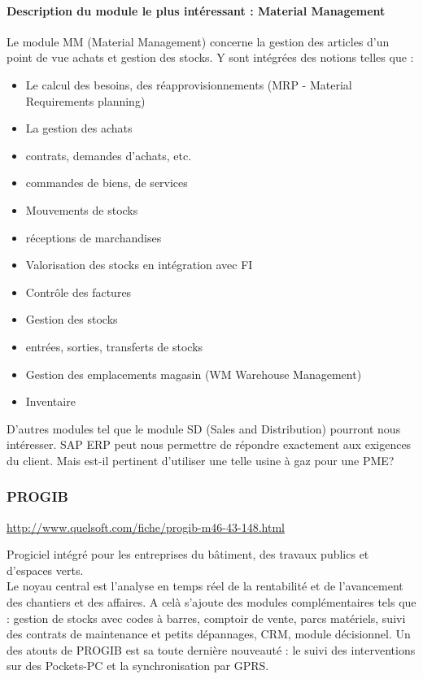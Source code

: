\paragraph{Description du module le plus intéressant : Material Management}
Le module MM (Material Management) concerne la gestion des articles d'un point de vue achats et gestion des stocks.
Y sont intégrées des notions telles que :
\begin{itemize}
    \item Le calcul des besoins, des réapprovisionnements (MRP - Material Requirements planning)
    \item La gestion des achats
    \item contrats, demandes d'achats, etc.
    \item commandes de biens, de services
    \item Mouvements de stocks
    \item réceptions de marchandises
    \item Valorisation des stocks en intégration avec FI
    \item Contrôle des factures
    \item Gestion des stocks
    \item entrées, sorties, transferts de stocks
    \item Gestion des emplacements magasin (WM Warehouse Management)
    \item Inventaire
\end{itemize}

D'autres modules tel que le module SD (Sales and Distribution) pourront nous intéresser.
SAP ERP peut nous permettre de répondre exactement aux exigences du client. Mais est-il pertinent d'utiliser une telle usine à gaz pour une PME?  

		\subsubsection{PROGIB}
				\url{http://www.quelsoft.com/fiche/progib-m46-43-148.html}
				 
				Progiciel intégré pour les entreprises du bâtiment, des travaux publics et d'espaces verts.\\

Le noyau central est l'analyse en temps réel de la rentabilité et de l'avancement des chantiers et des affaires. A celà s'ajoute des modules complémentaires tels que
 : gestion de stocks avec codes à barres, comptoir de vente, parcs matériels, suivi des contrats de maintenance et petits dépannages, CRM, module décisionnel.
Un des atouts de PROGIB est sa toute dernière nouveauté : le suivi des interventions sur des Pockets-PC et la synchronisation par GPRS.

